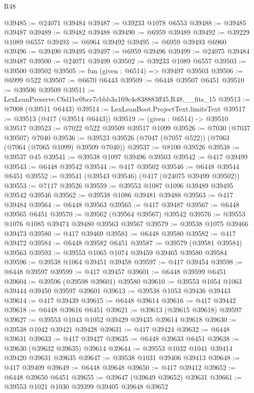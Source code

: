 \begin{lexlean}{R48}
\begin{coremodule}
@39485 := @24071 @39484
@39487 := @39233 @1078 @6553
@39488 := @39485 @39487
@39489 := @39482 @39488
@39490 := @6959 @39489
@39492 := @39229 @1089 @6557
@39493 := @6964 @39492
@39495 := @6959 @39493 @6960
@39496 := @39490 @39495
@39497 := @6959 @39496
@39499 := @24075 @39484 @39487
@39500 := @24071 @39499
@39502 := @39233 @1089 @6557
@39503 := @39500 @39502
@39505 := fun (given : @6514) => @39497 @39503
@39506 := @6999 @522
@39507 := @6670 @6443
@39509 := @6448 @39507 @6451
@39510 := @39506 @39509
@39511 := LexLeanPreserve.C6d1bc0bcc7cbbb3a169c4e838883ff45.R48.__fits_15
@39513 := @7008 (@39511 @6443)
@39514 := LexLeanBoot.ProjectText.limitsText
@39517 := @39513 (@417 (@39514 @6443))
@39519 := (given : @6514) -> @39510 @39517
@39523 := @7022 @522 @39509 @39517 @1099
@39526 := @7030 (@7037 @39507) @7040
@39536 := @39523 @39526 (@7047 (@7057 @522)) (@7063 (@7064 (@7065 @1099) @39509 @7040))
@39537 := @8100 @39526
@39538 := @39537 @45
@39541 := @39538 @1097 @39496 @39503
@39542 := @417 @39499
@39543 := @6448 @39542
@39544 := @417 @39502
@39546 := @6448 @39544 @6451
@39552 := @39541 (@39543 @39546) (@417 (@24075 @39499 @39502))
@39553 := @7117 @39526
@39559 := @39553 @1087 @1096 @39489 @39495 @39542 @39546
@39562 := @39538 @1086 @39481 @39488
@39563 := @417 @39484
@39564 := @6448 @39563
@39565 := @417 @39487
@39567 := @6448 @39565 @6451
@39570 := @39562 (@39564 @39567) @39542
@39576 := @39553 @1076 @1085 @39474 @39480 @39563 @39567
@39579 := @39538 @1075 @39466 @39473
@39580 := @417 @39469
@39581 := @6448 @39580
@39582 := @417 @39472
@39584 := @6448 @39582 @6451
@39587 := @39579 (@39581 @39584) @39563
@39593 := @39553 @1065 @1074 @39459 @39465 @39580 @39584
@39596 := @39538 @1064 @39451 @39458
@39597 := @417 @39454
@39598 := @6448 @39597
@39599 := @417 @39457
@39601 := @6448 @39599 @6451
@39604 := @39596 (@39598 @39601) @39580
@39610 := @39553 @1054 @1063 @39444 @39450 @39597 @39601
@39613 := @39538 @1053 @39436 @39443
@39614 := @417 @39439
@39615 := @6448 @39614
@39616 := @417 @39442
@39618 := @6448 @39616 @6451
@39621 := @39613 (@39615 @39618) @39597
@39627 := @39553 @1043 @1052 @39429 @39435 @39614 @39618
@39630 := @39538 @1042 @39421 @39428
@39631 := @417 @39424
@39632 := @6448 @39631
@39633 := @417 @39427
@39635 := @6448 @39633 @6451
@39638 := @39630 (@39632 @39635) @39614
@39644 := @39553 @1032 @1041 @39414 @39420 @39631 @39635
@39647 := @39538 @1031 @39406 @39413
@39648 := @417 @39409
@39649 := @6448 @39648
@39650 := @417 @39412
@39652 := @6448 @39650 @6451
@39655 := @39647 (@39649 @39652) @39631
@39661 := @39553 @1021 @1030 @39399 @39405 @39648 @39652

\end{coremodule}
\end{lexlean}
